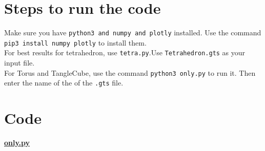 \documentclass[11pt]{article}
\begin{document}
\section{Steps to run the code}
Make sure you have \ttfamily \texttt{python3 and numpy and plotly} \normalfont installed. 
Use the command \ttfamily \texttt{pip3 install numpy plotly}  \normalfont to install them. \\
For best results for tetrahedron, use \ttfamily \texttt{tetra.py}.\normalfont Use \ttfamily \texttt{Tetrahedron.gts} \normalfont as your input file. \\
For Torus and TangleCube, use the command \ttfamily \texttt{python3 only.py} \normalfont to run it. Then enter the name of the of the \ttfamily \texttt{.gts} \normalfont file.

\section{Code}
\href{https://github.com/harsha-deep/BCTImplementationProject/blob/main/only.py}{\textbf{only.py}}
\end{document}
